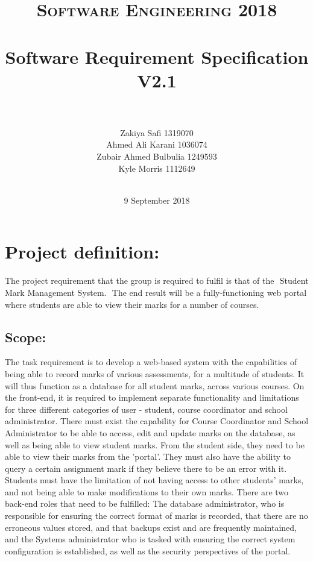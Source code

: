 \documentclass[paper=a4, fontsize=11pt]{scrartcl}
\title{
		\usefont{OT1}{bch}{b}{n}
		\normalfont \normalsize \textsc{Software Engineering 2018} \\ [25pt]
		\horrule{0.5pt} \\[0.4cm]
		\huge Software Requirement Specification V2.1\\
		\horrule{2pt} \\[0.5cm]
}
\author{
		\normalfont 					
       \normalsize Zakiya Safi 1319070\\
       \normalsize Ahmed Ali Karani 1036074 \\
       \normalsize Zubair Ahmed Bulbulia 1249593 \\
        \normalsize Kyle Morris 1112649\\\\[-3pt]	}	\normalsize
\date{9 September 2018}
\numberwithin{equation}{section}		%
\numberwithin{figure}{section}			%
\numberwithin{table}{section}				%
\begin{document}
\maketitle

\newpage \tableofcontents

\newpage
\section{Project definition:}
The project requirement that the group is required to fulfil is that of the ​ Student Mark
Management System. ​ The end result will be a fully-functioning web portal where students
are able to view their marks for a number of courses.

\subsection{Scope:}
The task requirement is to develop a web-based system with the capabilities of being able to
record marks of various assessments, for a multitude of students. It will thus function as a
database for all student marks, across various courses. On the front-end, it is required to
implement separate functionality and limitations for three different categories of user -
student, course coordinator and school administrator. There must exist the capability for
Course Coordinator and School Administrator to be able to access, edit and update marks
on the database, as well as being able to view student marks. From the student side, they
need to be able to view their marks from the 'portal'. They must also have the ability to query
a certain assignment mark if they believe there to be an error with it. Students must have the
limitation of not having access to other students' marks, and not being able to make
modifications to their own marks.
There are two back-end roles that need to be fulfilled: The database administrator, who is
responsible for ensuring the correct format of marks is recorded, that there are no erroneous
values stored, and that backups exist and are frequently maintained, and the Systems
administrator who is tasked with ensuring the correct system configuration is established, as
well as the security perspectives of the portal.
\\
\end{document}
